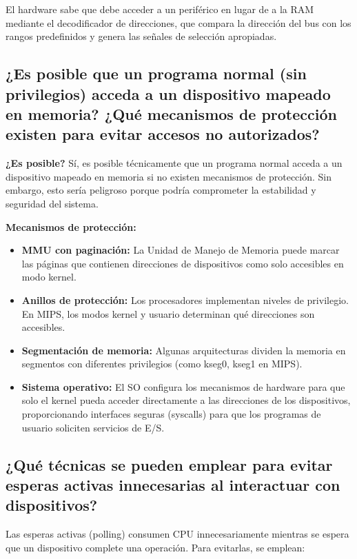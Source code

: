 \documentclass[12pt]{article}
\begin{document}
	El hardware sabe que debe acceder a un periférico en lugar de a la RAM mediante el decodificador de direcciones, que compara la dirección del bus con los rangos predefinidos y genera las señales de selección apropiadas.
	
	\subsection{¿Es posible que un programa normal (sin privilegios) acceda a un dispositivo mapeado en memoria? ¿Qué mecanismos de protección existen para evitar accesos no autorizados?}
	
	\textbf{¿Es posible?} Sí, es posible técnicamente que un programa normal acceda a un dispositivo mapeado en memoria si no existen mecanismos de protección. Sin embargo, esto sería peligroso porque podría comprometer la estabilidad y seguridad del sistema.
	
	\textbf{Mecanismos de protección:}
	\begin{itemize}
		\item \textbf{MMU con paginación:} La Unidad de Manejo de Memoria puede marcar las páginas que contienen direcciones de dispositivos como solo accesibles en modo kernel.
		\item \textbf{Anillos de protección:} Los procesadores implementan niveles de privilegio. En MIPS, los modos kernel y usuario determinan qué direcciones son accesibles.
		\item \textbf{Segmentación de memoria:} Algunas arquitecturas dividen la memoria en segmentos con diferentes privilegios (como kseg0, kseg1 en MIPS).
		\item \textbf{Sistema operativo:} El SO configura los mecanismos de hardware para que solo el kernel pueda acceder directamente a las direcciones de los dispositivos, proporcionando interfaces seguras (syscalls) para que los programas de usuario soliciten servicios de E/S.
	\end{itemize}
	
	\subsection{¿Qué técnicas se pueden emplear para evitar esperas activas innecesarias al interactuar con dispositivos?}
	
	Las esperas activas (polling) consumen CPU innecesariamente mientras se espera que un dispositivo complete una operación. Para evitarlas, se emplean:
	
\end{document}
